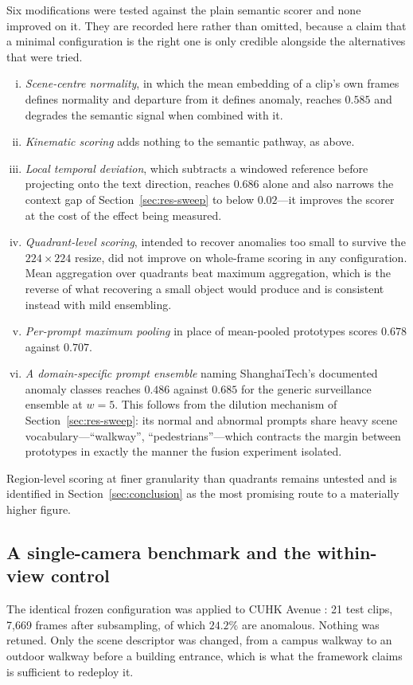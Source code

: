 \documentclass[a4paper,fleqn]{cas-sc}
\begin{document}
Six modifications were tested against the plain semantic scorer and none
improved on it. They are recorded here rather than omitted, because a claim that
a minimal configuration is the right one is only credible alongside the
alternatives that were tried.

\begin{enumerate}[(i)]
  \item \emph{Scene-centre normality}, in which the mean embedding of a clip's
        own frames defines normality and departure from it defines anomaly,
        reaches $0.585$ and degrades the semantic signal when combined with it.
  \item \emph{Kinematic scoring} adds nothing to the semantic pathway, as above.
  \item \emph{Local temporal deviation}, which subtracts a windowed reference
        before projecting onto the text direction, reaches $0.686$ alone and
        also narrows the context gap of Section~\ref{sec:res-sweep} to below
        $0.02$---it improves the scorer at the cost of the effect being measured.
  \item \emph{Quadrant-level scoring}, intended to recover anomalies too small
        to survive the $224\times224$ resize, did not improve on whole-frame
        scoring in any configuration. Mean aggregation over quadrants beat
        maximum aggregation, which is the reverse of what recovering a small
        object would produce and is consistent instead with mild ensembling.
  \item \emph{Per-prompt maximum pooling} in place of mean-pooled prototypes
        scores $0.678$ against $0.707$.
  \item \emph{A domain-specific prompt ensemble} naming ShanghaiTech's
        documented anomaly classes reaches $0.486$ against $0.685$ for the
        generic surveillance ensemble at $w{=}5$. This follows from the dilution
        mechanism of Section~\ref{sec:res-sweep}: its normal and abnormal
        prompts share heavy scene vocabulary---``walkway'',
        ``pedestrians''---which contracts the margin between prototypes in
        exactly the manner the fusion experiment isolated.
\end{enumerate}

Region-level scoring at finer granularity than quadrants remains untested and is
identified in Section~\ref{sec:conclusion} as the most promising route to a
materially higher figure.

\subsection{A single-camera benchmark and the within-view control}
\label{sec:res-avenue}
The identical frozen configuration was applied to CUHK Avenue
\citep{lu2013avenue}: 21 test clips, 7{,}669 frames after subsampling, of which
$24.2\%$ are anomalous. Nothing was retuned. Only the scene descriptor was
changed, from a campus walkway to an outdoor walkway before a building entrance,
which is what the framework claims is sufficient to redeploy it.
\end{document}
